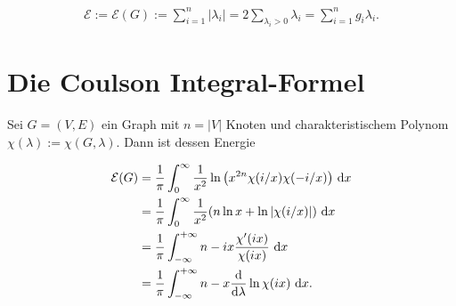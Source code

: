         \begin{align*}
            \mathcal E
            :=
            \mathcal E(G)
            :=
            \sum_{i=1}^n |\lambda_i|
            =
            2 \sum_{\lambda_i > 0} \lambda_i
            =
            \sum_{i=1}^n g_i \lambda_i.    
        \end{align*}


    \section{Die Coulson Integral-Formel}

        \begin{theorem}

            Sei $G = (V, E)$ ein Graph mit $n = |V|$ Knoten und charakteristischem Polynom $\chi(\lambda) := \chi(G, \lambda)$.
            Dann ist dessen Energie

            \begin{align}
                \mathcal E(G)
                & =
                \frac{1}{\pi}
                \int_0^\infty
                    \frac{1}{x^2}
                    \ln {\left ( x^{2 n} \chi(i/x) \chi(-i/x) \right )}
                    ~ \mathrm d x
                \label{eq:Coulson_1} \\
                & =
                \frac{1}{\pi}
                \int_0^\infty
                    \frac{1}{x^2}
                    {\left ( 
                        n \ln x
                        +
                        \ln |\chi(i/x)|
                     \right )}
                    ~ \mathrm d x
                \label{eq:Coulson_2} \\
                & =
                \frac{1}{\pi}
                \int_{-\infty}^{+\infty}
                    n - i x \frac{\chi^\prime(i x)}{\chi(i x)}
                    ~ \mathrm d x
                \label{eq:Coulson_3} \\
                & =
                \frac{1}{\pi}
                \int_{-\infty}^{+\infty}
                    n - x \frac{\mathrm d}{\mathrm d \lambda} \ln \chi(i x)
                    ~ \mathrm d x.
                \label{eq:Coulson_4}
            \end{align}

        \end{theorem}
            
